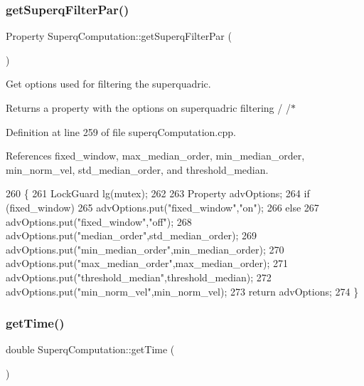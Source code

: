 \subsubsection{\texorpdfstring{get\+Superq\+Filter\+Par()}{getSuperqFilterPar()}}
{\footnotesize\ttfamily Property Superq\+Computation\+::get\+Superq\+Filter\+Par (\begin{DoxyParamCaption}{ }\end{DoxyParamCaption})}



Get options used for filtering the superquadric. 

\begin{DoxyReturn}{Returns}
a property with the options on superquadric filtering / /$\ast$ 
\end{DoxyReturn}


Definition at line 259 of file superq\+Computation.\+cpp.



References fixed\+\_\+window, max\+\_\+median\+\_\+order, min\+\_\+median\+\_\+order, min\+\_\+norm\+\_\+vel, std\+\_\+median\+\_\+order, and threshold\+\_\+median.


\begin{DoxyCode}
260 \{
261     LockGuard lg(mutex);
262 
263     Property advOptions;
264     \textcolor{keywordflow}{if} (fixed_window)
265         advOptions.put(\textcolor{stringliteral}{"fixed\_window"},\textcolor{stringliteral}{"on"});
266     \textcolor{keywordflow}{else}
267         advOptions.put(\textcolor{stringliteral}{"fixed\_window"},\textcolor{stringliteral}{"off"});
268     advOptions.put(\textcolor{stringliteral}{"median\_order"},std_median_order);
269     advOptions.put(\textcolor{stringliteral}{"min\_median\_order"},min_median_order);
270     advOptions.put(\textcolor{stringliteral}{"max\_median\_order"},max_median_order);
271     advOptions.put(\textcolor{stringliteral}{"threshold\_median"},threshold_median);
272     advOptions.put(\textcolor{stringliteral}{"min\_norm\_vel"},min_norm_vel);
273     \textcolor{keywordflow}{return} advOptions;
274 \}
\end{DoxyCode}
\mbox{\label{classSuperqComputation_a6822767dea4b3b819f9190289d9f89a5}} 
\subsubsection{\texorpdfstring{get\+Time()}{getTime()}}
{\footnotesize\ttfamily double Superq\+Computation\+::get\+Time (\begin{DoxyParamCaption}{ }\end{DoxyParamCaption})}



